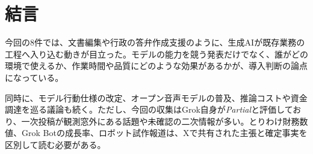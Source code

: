 \section*{結言}
今回の8件では、文書編集や行政の答弁作成支援のように、生成AIが既存業務の工程へ入り込む動きが目立った。モデルの能力を競う発表だけでなく、誰がどの環境で使えるか、作業時間や品質にどのような効果があるかが、導入判断の論点になっている。

同時に、モデル行動仕様の改定、オープン音声モデルの普及、推論コストや資金調達を巡る議論も続く。ただし、今回の収集はGrok自身が\textit{Partial}と評価しており、一次投稿が観測窓外にある話題や未確認の二次情報が多い。とりわけ財務数値、Grok Botの成長率、ロボット試作報道は、Xで共有された主張と確定事実を区別して読む必要がある。
